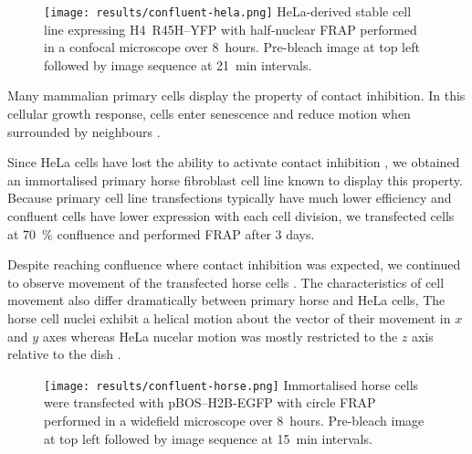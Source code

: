     \begin{figure}
      \centering
      \texttt{[image: results/confluent-hela.png]}
        {
          HeLa-derived stable cell line expressing H4~R45H--YFP
          with half-nuclear FRAP performed in a confocal microscope over 8~hours.
          Pre-bleach image at top left followed by image sequence at 21~min intervals.
        }
      \label{fig:kill-frap:confluent-hela}
    \end{figure}


    Many mammalian primary cells display the property of contact inhibition.
    In this cellular growth response, cells enter senescence and reduce motion
    when surrounded by neighbours \citep{?}.

    Since HeLa cells have lost the ability to activate contact inhibition \citep{?},
    we obtained an immortalised primary horse fibroblast cell line known to display this property.
    Because primary cell line transfections typically have much lower efficiency
    and confluent cells have lower expression with each cell division,
    we transfected cells at \SI{70}{\percent} confluence and performed FRAP after 3 days.

    Despite reaching confluence where contact inhibition was expected, 
    we continued to observe movement of the transfected horse cells .
    The characteristics of cell movement also differ dramatically between primary horse and HeLa cells,
    The horse cell nuclei exhibit a helical motion about the vector of their movement 
    in $x$ and $y$ axes 
    whereas HeLa nucelar motion was mostly restricted to the $z$ axis relative to the dish .

    \begin{figure}
      \centering
      \texttt{[image: results/confluent-horse.png]}
        {
          Immortalised horse cells were transfected with pBOS--H2B-EGFP
          with circle FRAP performed in a widefield microscope over 8~hours.
          Pre-bleach image at top left followed by image sequence at 15~min intervals.
        }
      \label{fig:kill-frap:confluent-horse}
    \end{figure}

